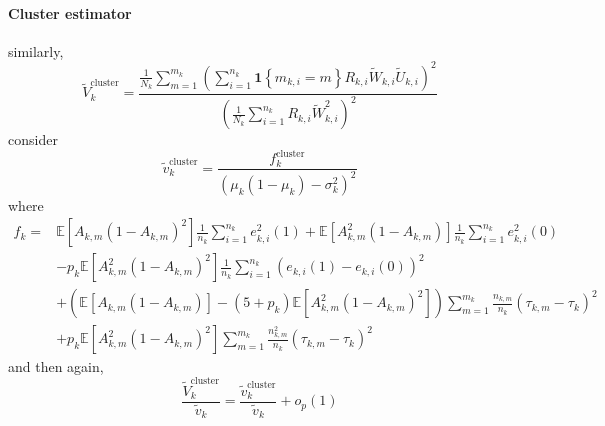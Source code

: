 \documentclass[twoside]{article}
\begin{document}
\paragraph*{Cluster estimator} similarly,
\begin{equation*}
    \tilde{V}^{\text{cluster}}_k = \frac{\frac{1}{N_k}\sum^{m_k}_{m=1}\left(\sum^{n_k}_{i=1}\mathbf{1}\left\{m_{k,i}=m\right\} R_{k,i}\tilde{W}_{k,i}\tilde{U}_{k,i} \right)^2}{ \left(\frac{1}{N_k} \sum^{n_k}_{i=1}R_{k,i}\tilde{W}_{k,i}^2\right)^2 }
\end{equation*}
consider 
\begin{equation*}
    \tilde{v}_k^{\text{cluster}} = \frac{f^{\text{cluster}}_k}{ \left( \mu_k\left(1-\mu_k\right)-\sigma^2_k \right)^2}
\end{equation*}
where
\begin{align*}
    f_k =& \mathbb{E}\left[A_{k,m}\left(1-A_{k,m}\right)^2\right]\frac{1}{n_k}\sum^{n_k}_{i=1}e^2_{k,i}(1) + \mathbb{E}\left[A_{k,m}^2\left(1-A_{k,m}\right)\right]\frac{1}{n_k}\sum^{n_k}_{i=1}e^2_{k,i}(0) \\
    &- p_k \mathbb{E}\left[A_{k,m}^2\left(1-A_{k,m}\right)^2\right] \frac{1}{n_k}\sum^{n_k}_{i=1}\left(e_{k,i}(1)-e_{k,i}(0)\right)^2 \\
    &+ \left( \mathbb{E} [A_{k,m}(1-A_{k,m})] - (5+p_k) \mathbb{E}[A_{k,m}^2(1-A_{k,m})^2] \right)\sum^{m_k}_{m=1}\frac{n_{k,m}}{n_k}(\tau_{k,m}-\tau_k)^2 \\
    &+ p_k \mathbb{E} [A_{k,m}^2(1-A_{k,m})^2] \sum^{m_k}_{m=1}\frac{n^2_{k,m}}{n_k}(\tau_{k,m}-\tau_k)^2
\end{align*}
and then again,
\begin{equation*}
    \frac{\tilde{V}^{\text{cluster}}_k}{\tilde{v}_k} = \frac{\tilde{v}^{\text{cluster}}_k}{\tilde{v}_k} + o_p(1)
\end{equation*}
\end{document}
